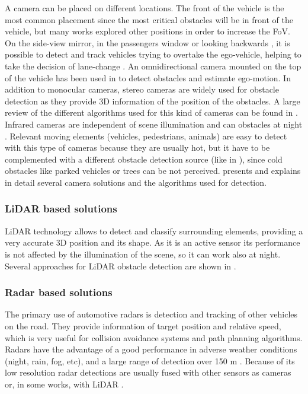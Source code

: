 A camera can be placed on different locations. The front of the vehicle is 
the most common placement since the most critical obstacles will be in front of 
the vehicle, but many works explored other positions in order to increase the
FoV. On the side-view mirror, in the 
passengers window \cite{chang2008real} or looking backwards \cite{liu2007rear}, 
it is possible to detect and track vehicles trying to overtake the ego-vehicle, 
helping to take the decision of lane-change \cite{alonso2008lane, 
song2007lateral, blanc2007larasidecam}. An omnidirectional camera mounted
on the top of the vehicle has been used in \cite{gandhi2006vehicle}
to detect obstacles and estimate ego-motion.
In addition to monocular cameras, stereo cameras are widely used for obstacle 
detection as they provide 3D information of the position of the obstacles. A 
large review of the different algorithms used for this kind of cameras can be 
found in \cite{bernini2014real}.
Infrared cameras are independent of scene illumination and can obstacles at
night \cite{olmeda2013pedestrian}. Relevant moving elements (vehicles, 
pedestrians, animals) are easy to detect with this type of cameras because they
are usually hot, but it have to be complemented with a different obstacle
detection source (like in \cite{krotosky2007color}), since cold obstacles like
parked vehicles or trees can be not perceived.
\cite{sivaraman2013looking} presents and explains in detail several camera
solutions and the algorithms used for detection.

\subsubsection{LiDAR based solutions}
LiDAR technology allows to detect and classify surrounding elements, providing
a very accurate 3D position and its shape. 
As it is an active sensor its performance is not affected by the illumination 
of the scene, so it can work also at night. Several approaches for LiDAR 
obstacle detection are shown in \cite{li2016vehicle}.

\subsubsection{Radar based solutions}
The primary use of automotive radars is detection and tracking of other 
vehicles on the road. They provide information of target position and relative 
speed, which is very useful for collision avoidance systems and path planning
algorithms. 
Radars have the advantage of a good performance in adverse weather conditions 
(night, rain, fog, etc), and a large range of detection over 150 m
\cite{blanc2004obstacle}. Because of its low resolution radar detections are
usually fused with other sensors as cameras \cite{garcia2012data} or, in some
works, with LiDAR \cite{gohring2011radar}.


